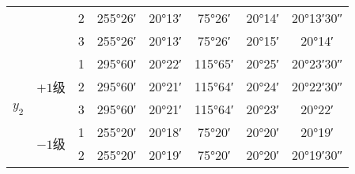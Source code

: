 \documentclass[a4paper]{article}
\begin{document}
\begin{changemargin}{1cm}{1cm}
\begin{table}[htbp]
{\begin{tabular}{cccccccc}
                                                            &                         & 2                  & \ang{255;26;}                  & \ang{20;13;}                                & \ang{75;26;}                   & \ang{20;14;}                                                        & \ang{20;13;30}                                             \\
                                                            &                         & 3                  & \ang{255;26;}                  & \ang{20;13;}                                & \ang{75;26;}                   & \ang{20;15;}                                                        & \ang{20;14;}                                               \\\hline
                \multirow{6}{*}{$y_2$}                      & \multirow{3}{*}{$+1$级} & 1                  & \ang{295;60;}                  & \ang{20;22;}                                & \ang{115;65;}                  & \ang{20;25;}                                                        & \ang{20;23;30}                                             \\
                                                            &                         & 2                  & \ang{295;60;}                  & \ang{20;21;}                                & \ang{115;64;}                  & \ang{20;24;}                                                        & \ang{20;22;30}                                             \\
                                                            &                         & 3                  & \ang{295;60;}                  & \ang{20;21;}                                & \ang{115;64;}                  & \ang{20;23;}                                                        & \ang{20;22;}                                               \\
                                                            & \multirow{3}{*}{$-1$级} & 1                  & \ang{255;20;}                  & \ang{20;18;}                                & \ang{75;20;}                   & \ang{20;20;}                                                        & \ang{20;19;}                                               \\
                                                            &                         & 2                  & \ang{255;20;}                  & \ang{20;19;}                                & \ang{75;20;}                   & \ang{20;20;}                                                        & \ang{20;19;30}                                             \\

\end{tabular}}
\end{table}
\end{changemargin}
\end{document}
